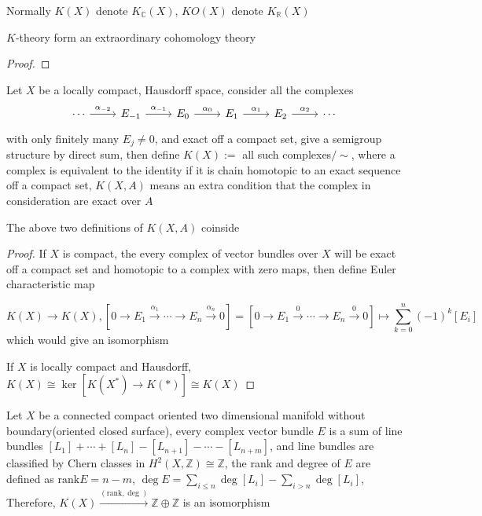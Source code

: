 \documentclass[../main.tex]{subfiles}
\begin{document}
\begin{remark}
Normally $K(X)$ denote $K_{\mathbb C}(X)$, $KO(X)$ denote $K_{\mathbb R}(X)$
\end{remark}

\begin{theorem}
$K$-theory form an extraordinary cohomology theory
\end{theorem}

\begin{proof}

\end{proof}

\begin{definition}
Let $X$ be a locally compact, Hausdorff space, consider all the complexes
\[
\begin{tikzcd}
{\cdots} \arrow[r, "\alpha_{-2}"] & E_{-1} \arrow[r, "\alpha_{-1}"] & E_{0} \arrow[r, "\alpha_0"] & E_{1} \arrow[r, "\alpha_1"] & E_{2} \arrow[r, "\alpha_2"] & {\cdots}
\end{tikzcd}
\]
with only finitely many $E_j\neq0$, and exact off a compact set, give a semigroup structure by direct sum, then define $K(X):=$ all such complexes$/\sim$, where a complex is equivalent to the identity if it is chain homotopic to an exact sequence off a compact set, $K(X,A)$ means an extra condition that the complex in consideration are exact over $A$
\end{definition}

\begin{proposition}
The above two definitions of $K(X,A)$ coinside
\end{proposition}

\begin{proof}
If $X$ is compact, the every complex of vector bundles over $X$ will be exact off a compact set and homotopic to a complex with zero maps, then define Euler characteristic map\par\[ K(X)\to K(X), \left[0\to E_1\overset{\alpha_1}{\to}\cdots\to E_n\overset{\alpha_n}{\to}0\right]=\left[0\to E_1\overset{0}{\to}\cdots\to E_n\overset{0}{\to}0\right]\mapsto\displaystyle\sum_{k=0}^n(-1)^k[E_i] \]
which would give an isomorphism \par
If $X$ is locally compact and Hausdorff, $K(X)\cong\ker\left[K(X^*)\to K(*)\right]\cong K(X)$
\end{proof}

\begin{theorem}
Let $X$ be a connected compact oriented two dimensional manifold without boundary(oriented closed surface), every complex vector bundle $E$ is a sum of line bundles $[L_1]+\cdots+[L_n]-[L_{n+1}]-\cdots-[L_{n+m}]$, and line bundles are classified by Chern classes in $H^2(X,\mathbb Z)\cong\mathbb Z$, the rank and degree of $E$ are defined as $\mathrm{rank}E=n-m$, $\displaystyle\deg E=\sum_{i\leq n}\deg [L_i]-\sum_{i> n}\deg [L_i]$, Therefore, $K(X)\xrightarrow{(\mathrm{rank},\deg)}\mathbb Z\oplus\mathbb Z$ is an isomorphism
\end{theorem}
\end{document}
